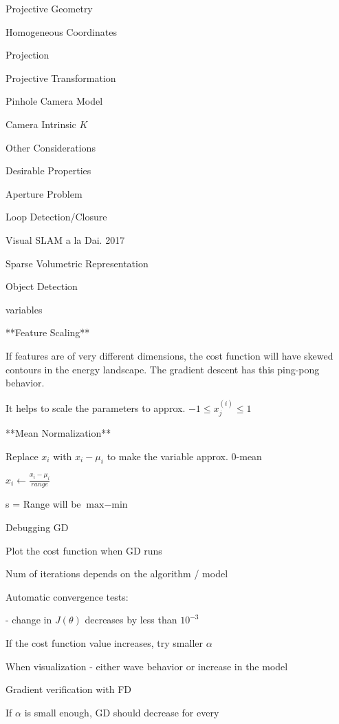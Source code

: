 \begin{section}
\begin{subsubsection}
\begin{subsubsection}
\begin{subsubsection}
\begin{section}{Projective Geometry}
\begin{subsection}{Homogeneous Coordinates}
\begin{subsubsection}
{\begin{subsubsection}{Projection}
\begin{subsubsection}{Projective Transformation}
\begin{subsection}
\begin{subsubsection}
\begin{subsubsection}
\begin{subsubsection}
{\begin{subsubsection}
\begin{subsection}
\begin{subsection} {Pinhole Camera Model}
\begin{subsection} {Camera Intrinsic $K$}
\begin{subsection}
\begin{subsection}
\begin{subsubsection}{Other Considerations}
{\begin{subsection}
\begin{subsubsection}{Desirable Properties}
\begin{section}
\begin{subsection}
\begin{subsection}
\begin{subsection}
\begin{section}
\begin{subsection}
\begin{subsubsection}
\begin{subsubsection}
\begin{subsection}
\begin{section}
\begin{subsection}
\begin{subsubsection}{Aperture Problem}
\begin{subsubsection}
{\begin{section}
\begin{subsubsection}
\begin{subsubsection}
\begin{subsubsection}
\begin{subsection}
\begin{subsection}
\begin{subsection}
\begin{subsection}
\begin{subsection}
\begin{subsection}
\begin{subsection}
\begin{subsubsection}
{\begin{subsubsection}
{\begin{subsubsection}
\begin{section}
\begin{section}
\begin{section}
\begin{subsubsection}
\begin{subsubsection}{Loop Detection/Closure}
\begin{subsubsection}{Visual SLAM a la Dai. 2017}
\begin{subsubsection}{Sparse Volumetric Representation}
\begin{subsection}
\begin{section}{Object Detection}
\begin{subsubsection}
{\begin{subsection}
\begin{subsection}
\begin{section}
\begin{section}
\begin{subsection}
\begin{subsubsection}
\begin{subsubsection}
\begin{subsection}
variables

**Feature Scaling**

If features are of very different dimensions, the cost function will have skewed contours in the energy landscape. The gradient descent has this ping-pong behavior.  

It helps to scale the parameters to approx. $-1 \le x_j^{(i)}\le 1$

**Mean Normalization**

Replace $x_i$ with $x_i - \mu_i$ to make the variable approx. 0-mean

$x_i \leftarrow \frac{x_i-\mu_i}{range}$

s = Range will be $\text{max}-\text{min}$

\begin{subsection} Debugging GD

Plot the cost function when GD runs

Num of iterations depends on the algorithm / model

Automatic convergence tests:

- change in $J(\theta)$ decreases by less than $10^{-3}$

If the cost function value increases, try smaller $\alpha$

When visualization - either wave behavior or increase in the model

Gradient verification with FD

If $\alpha$ is small enough, GD should decrease for every 
\end{subsection}
\end{subsection}
\end{subsubsection}
\end{subsubsection}
\end{subsection}
\end{section}
\end{section}
\end{subsection}
\end{subsection}}
\end{subsubsection}
\end{section}
\end{subsection}
\end{subsubsection}
\end{subsubsection}
\end{subsubsection}
\end{subsubsection}
\end{section}
\end{section}
\end{section}
\end{subsubsection}}
\end{subsubsection}}
\end{subsubsection}
\end{subsection}
\end{subsection}
\end{subsection}
\end{subsection}
\end{subsection}
\end{subsection}
\end{subsection}
\end{subsubsection}
\end{subsubsection}
\end{subsubsection}
\end{section}}
\end{subsubsection}
\end{subsubsection}
\end{subsection}
\end{section}
\end{subsection}
\end{subsubsection}
\end{subsubsection}
\end{subsection}
\end{section}
\end{subsection}
\end{subsection}
\end{subsection}
\end{section}
\end{subsubsection}
\end{subsection}}
\end{subsubsection}
\end{subsection}
\end{subsection}
\end{subsection}
\end{subsection}
\end{subsection}
\end{subsubsection}}
\end{subsubsection}
\end{subsubsection}
\end{subsubsection}
\end{subsection}
\end{subsubsection}
\end{subsubsection}}
\end{subsubsection}
\end{subsection}
\end{section}
\end{subsubsection}
\end{subsubsection}
\end{subsubsection}
\end{section}
